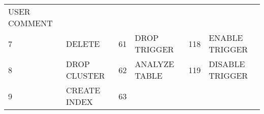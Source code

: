 \begin{longtable}[]{@{}llllll@{}}
\begin{minipage}[t]{0.24\columnwidth}
USER COMMENT\strut
\end{minipage}\tabularnewline
\begin{minipage}[t]{0.06\columnwidth}\raggedright\strut
7\strut
\end{minipage} & \begin{minipage}[t]{0.19\columnwidth}\raggedright\strut
DELETE\strut
\end{minipage} & \begin{minipage}[t]{0.06\columnwidth}\raggedright\strut
61\strut
\end{minipage} & \begin{minipage}[t]{0.24\columnwidth}\raggedright\strut
DROP TRIGGER\strut
\end{minipage} & \begin{minipage}[t]{0.06\columnwidth}\raggedright\strut
118\strut
\end{minipage} & \begin{minipage}[t]{0.24\columnwidth}\raggedright\strut
ENABLE TRIGGER\strut
\end{minipage}\tabularnewline
\begin{minipage}[t]{0.06\columnwidth}\raggedright\strut
8\strut
\end{minipage} & \begin{minipage}[t]{0.19\columnwidth}\raggedright\strut
DROP CLUSTER\strut
\end{minipage} & \begin{minipage}[t]{0.06\columnwidth}\raggedright\strut
62\strut
\end{minipage} & \begin{minipage}[t]{0.24\columnwidth}\raggedright\strut
ANALYZE TABLE\strut
\end{minipage} & \begin{minipage}[t]{0.06\columnwidth}\raggedright\strut
119\strut
\end{minipage} & \begin{minipage}[t]{0.24\columnwidth}\raggedright\strut
DISABLE TRIGGER\strut
\end{minipage}\tabularnewline
\begin{minipage}[t]{0.06\columnwidth}\raggedright\strut
9\strut
\end{minipage} & \begin{minipage}[t]{0.19\columnwidth}\raggedright\strut
CREATE INDEX\strut
\end{minipage} & \begin{minipage}[t]{0.06\columnwidth}\raggedright\strut
63\strut
\end{minipage} & \begin{minipage}[t]{0.24\columnwidth}\raggedright\strut

\end{minipage}
\end{longtable}
